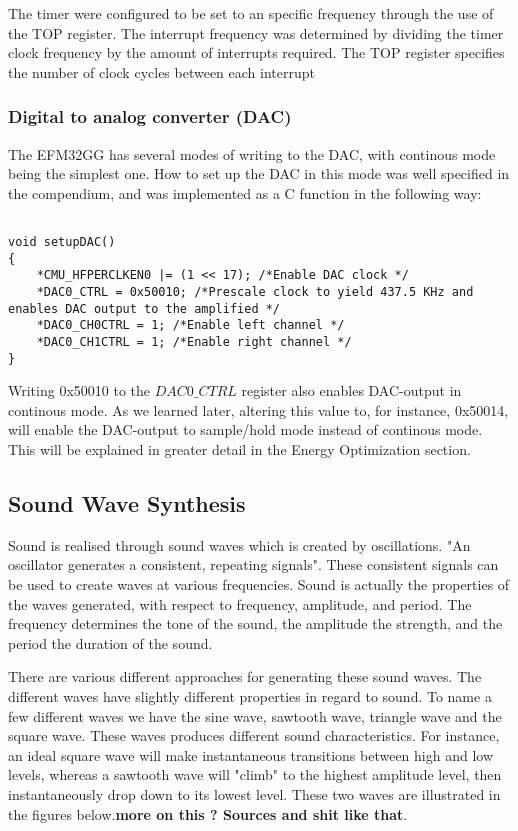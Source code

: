 The timer were configured to be set to an specific frequency through the use of the TOP register. The interrupt frequency was determined by dividing the timer clock frequency by the amount of interrupts required. The TOP register specifies the number of clock cycles between each interrupt


\subsubsection{Digital to analog converter (DAC)}

The EFM32GG has several modes of writing to the DAC, with continous mode being the simplest one. How to set up the DAC in this mode was well specified in the compendium, and was implemented as a C function in the following way:

\begin{lstlisting}

void setupDAC()
{
  	*CMU_HFPERCLKEN0 |= (1 << 17); /*Enable DAC clock */
	*DAC0_CTRL = 0x50010; /*Prescale clock to yield 437.5 KHz and enables DAC output to the amplified */
	*DAC0_CH0CTRL = 1; /*Enable left channel */
	*DAC0_CH1CTRL = 1; /*Enable right channel */
}

\end{lstlisting}

Writing 0x50010 to the $DAC0\_CTRL$ register also enables DAC-output in continous mode. As we learned later, altering  this value to, for instance, 0x50014, will enable the DAC-output to sample/hold mode instead of continous mode. This will be explained in greater detail in the Energy Optimization section.

\subsection{Sound Wave Synthesis}

Sound is realised through sound waves which is created by oscillations. "An oscillator generates a consistent, repeating signals". These consistent signals can be used to create waves at various frequencies. Sound is actually the properties of the waves generated, with respect to frequency, amplitude, and period. The frequency determines the tone of the sound, the amplitude the strength, and the period the duration of the sound.

There are various different approaches for generating these sound waves. The different waves have slightly different properties in regard to sound. To name a few different waves we have the sine wave, sawtooth wave, triangle wave and the square wave. These waves produces different sound characteristics. For instance, an ideal square wave will make instantaneous transitions between high and low levels, whereas a sawtooth wave will "climb" to the highest amplitude level, then instantaneously drop down to its lowest level. These two waves are illustrated in the figures below.{\bf more on this ? Sources and shit like that}. 

